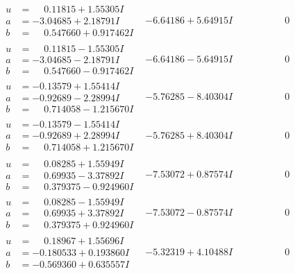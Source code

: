\documentclass[1p]{elsarticle_modified}
\theoremstyle{definition}
\begin{document}
$$\begin{array}{c|c|c}
\begin{aligned}
u &= \phantom{-}0.11815 + 1.55305 I \\
a &= -3.04685 + 2.18791 I \\
b &= \phantom{-}0.547660 + 0.917462 I\end{aligned}
 & -6.64186 + 5.64915 I & \phantom{-0.000000 } 0 \\ \hline\begin{aligned}
u &= \phantom{-}0.11815 - 1.55305 I \\
a &= -3.04685 - 2.18791 I \\
b &= \phantom{-}0.547660 - 0.917462 I\end{aligned}
 & -6.64186 - 5.64915 I & \phantom{-0.000000 } 0 \\ \hline\begin{aligned}
u &= -0.13579 + 1.55414 I \\
a &= -0.92689 - 2.28994 I \\
b &= \phantom{-}0.714058 - 1.215670 I\end{aligned}
 & -5.76285 - 8.40304 I & \phantom{-0.000000 } 0 \\ \hline\begin{aligned}
u &= -0.13579 - 1.55414 I \\
a &= -0.92689 + 2.28994 I \\
b &= \phantom{-}0.714058 + 1.215670 I\end{aligned}
 & -5.76285 + 8.40304 I & \phantom{-0.000000 } 0 \\ \hline\begin{aligned}
u &= \phantom{-}0.08285 + 1.55949 I \\
a &= \phantom{-}0.69935 - 3.37892 I \\
b &= \phantom{-}0.379375 - 0.924960 I\end{aligned}
 & -7.53072 + 0.87574 I & \phantom{-0.000000 } 0 \\ \hline\begin{aligned}
u &= \phantom{-}0.08285 - 1.55949 I \\
a &= \phantom{-}0.69935 + 3.37892 I \\
b &= \phantom{-}0.379375 + 0.924960 I\end{aligned}
 & -7.53072 - 0.87574 I & \phantom{-0.000000 } 0 \\ \hline\begin{aligned}
u &= \phantom{-}0.18967 + 1.55696 I \\
a &= -0.180533 + 0.193860 I \\
b &= -0.569360 + 0.635557 I\end{aligned}
 & -5.32319 + 4.10488 I & \phantom{-0.000000 } 0 \\ \hline\begin{aligned}

\end{aligned}
\end{array}$$
\end{document}
